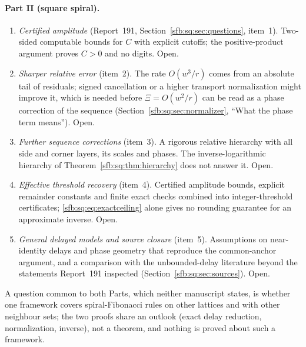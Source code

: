 \documentclass[11pt]{article}
\theoremstyle{remark}\newtheorem{remark}[theorem]{Remark}
\begin{document}
\paragraph{Part II (square spiral).}
\begin{enumerate}[resume]
\item\label{sfb:q:certified} \emph{Certified amplitude} (Report~191,
Section~\ref{sfb:sq:sec:questions}, item~1). Two-sided computable bounds for
$C$ with explicit cutoffs; the positive-product argument proves $C>0$ and no
digits. Open.
\item\label{sfb:q:sharper} \emph{Sharper relative error} (item~2). The rate
$O(w^3/r)$ comes from an absolute tail of residuals; signed cancellation or a
higher transport normalization might improve it, which is needed before
$\Xi=O(w^2/r)$ can be read as a phase correction of the sequence
(Section~\ref{sfb:sq:sec:normalizer}, ``What the phase term means''). Open.
\item\label{sfb:q:corrections} \emph{Further sequence corrections} (item~3).
A rigorous relative hierarchy with all side and corner layers, its scales and
phases. The inverse-logarithmic hierarchy of
Theorem~\ref{sfb:sq:thm:hierarchy} does not answer it. Open.
\item\label{sfb:q:threshold} \emph{Effective threshold recovery} (item~4).
Certified amplitude bounds, explicit remainder constants and finite exact
checks combined into integer-threshold certificates;
\eqref{sfb:sq:eq:exactceiling} alone gives no rounding guarantee for an
approximate inverse. Open.
\item\label{sfb:q:general} \emph{General delayed models and source closure}
(item~5). Assumptions on near-identity delays and phase geometry that
reproduce the common-anchor argument, and a comparison with the
unbounded-delay literature beyond the statements Report~191 inspected
(Section~\ref{sfb:sq:sec:sources}). Open.
\end{enumerate}
A question common to both Parts, which neither manuscript states, is whether
one framework covers spiral-Fibonacci rules on other lattices and with other
neighbour sets; the two proofs share an outlook (exact delay reduction,
normalization, inverse), not a theorem, and nothing is proved about such a
framework.
\end{document}

